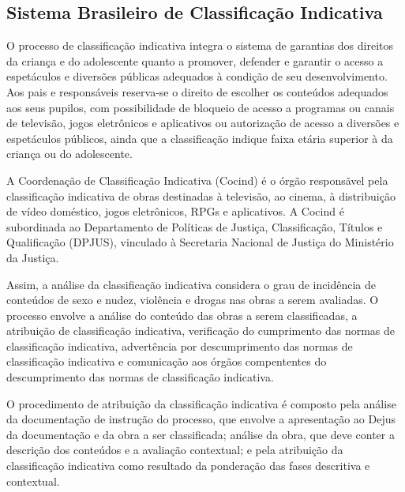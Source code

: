 \subsection{Sistema Brasileiro de Classificação Indicativa}

O processo de classificação indicativa integra o sistema de garantias dos direitos da criança e do adolescente quanto a promover, defender e garantir o acesso a espetáculos e diversões públicas adequados à condição de seu desenvolvimento. Aos pais e responsáveis reserva-se o direito de escolher os conteúdos adequados aos seus pupilos, com possibilidade de bloqueio de acesso a programas ou canais de televisão, jogos eletrônicos e aplicativos ou autorização de acesso a diversões e espetáculos públicos, ainda que a classificação indique faixa etária superior à da criança ou do adolescente.

A Coordenação de Classificação Indicativa (Cocind) é o órgão responsãvel pela classificação indicativa de obras destinadas à televisão, ao cinema, à distribuição de vídeo doméstico, jogos eletrônicos, RPGs e aplicativos. A Cocind é subordinada ao Departamento de Políticas de Justiça, Classificação, Títulos e Qualificação (DPJUS), vinculado à Secretaria Nacional de Justiça do Ministério da Justiça.


Assim, a análise da classificação indicativa considera o grau de incidência de conteúdos de sexo e nudez, violência e drogas nas obras a serem avaliadas. O processo envolve a análise do conteúdo das obras a serem classificadas, a atribuição de classificação indicativa, verificação do cumprimento das normas de classificação indicativa, advertência por descumprimento das normas de classificação indicativa e comunicação aos órgãos compententes do descumprimento das normas de classificação indicativa.

O procedimento de atribuição da classificação indicativa é composto pela análise da documentação de instrução do processo, que envolve a apresentação ao Dejus da documentação e da obra a ser classificada; análise da obra, que deve conter a descrição dos conteúdos e a avaliação contextual; e pela atribuição da classificação indicativa como resultado da ponderação das fases descritiva e contextual.

